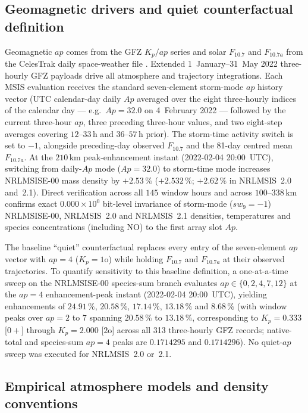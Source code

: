 \documentclass[12pt]{article}
\newcommand{\unit}[1]{\,\mathrm{#1}}
\begin{document}
\subsection{Geomagnetic drivers and quiet counterfactual definition}
\label{sec:quiet}

Geomagnetic $ap$ comes from the GFZ $K_p/ap$ series \citep{gfzkp} and solar
$F_{10.7}$ and $F_{10.7a}$ from the CelesTrak daily space-weather file
\citep{celestrak}. Extended 1~January--31~May 2022 three-hourly GFZ payloads drive all atmosphere and trajectory integrations. Each MSIS evaluation receives the standard seven-element storm-mode $ap$ history vector (UTC calendar-day daily $Ap$ averaged over the eight three-hourly indices of the calendar day --- e.g.\ $Ap = 32.0$ on 4~February 2022 --- followed by the current three-hour $ap$, three preceding three-hour values, and two eight-step averages covering $12$--$33\unit{h}$ and $36$--$57\unit{h}$ prior). The storm-time activity switch is set to $-1$, alongside preceding-day observed $F_{10.7}$ and the 81-day centred mean $F_{10.7a}$. At the $210\unit{km}$ peak-enhancement instant (2022-02-04 20:00~UTC), switching from daily-$Ap$ mode ($Ap = 32.0$) to storm-time mode increases NRLMSISE-00 mass density by $+2.53\,\%$ ($+2.532\,\%$; $+2.62\,\%$ in NRLMSIS~2.0 and~2.1). Direct verification across all $145$ window hours and across $100$--$338\unit{km}$ confirms exact $0.000\times10^{0}$ bit-level invariance of storm-mode ($sw_9 = -1$) NRLMSISE-00, NRLMSIS~2.0 and NRLMSIS~2.1 densities, temperatures and species concentrations (including NO) to the first array slot $Ap$.

The baseline ``quiet'' counterfactual replaces every entry of the seven-element $ap$ vector with $ap=4$ ($K_p = 1\mathrm{o}$) while holding $F_{10.7}$ and $F_{10.7a}$ at their observed trajectories. To quantify sensitivity to this baseline definition, a one-at-a-time sweep on the NRLMSISE-00 species-sum branch evaluates $ap \in \{0, 2, 4, 7, 12\}$ at the $ap=4$ enhancement-peak instant (2022-02-04 20:00~UTC), yielding enhancements of $24.91\,\%$, $20.58\,\%$, $17.14\,\%$, $13.18\,\%$ and $8.68\,\%$ (with window peaks over $ap=2$ to $7$ spanning $20.58\,\%$ to $13.18\,\%$, corresponding to $K_p = 0.333$ [$0+$] through $K_p = 2.000$ [$2\mathrm{o}$] across all 313 three-hourly GFZ records; native-total and species-sum $ap=4$ peaks are $0.1714295$ and $0.1714296$). No quiet-$ap$ sweep was executed for NRLMSIS~2.0 or~2.1.

\subsection{Empirical atmosphere models and density conventions}
\label{sec:densities}
\end{document}
